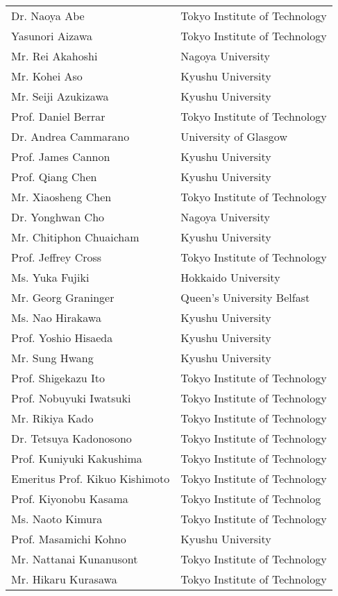 \begin{longtable}{ll}
Dr. Naoya Abe & Tokyo Institute of Technology \\
Yasunori Aizawa & Tokyo Institute of Technology \\
Mr. Rei Akahoshi & Nagoya University \\
Mr. Kohei Aso & Kyushu University \\
Mr. Seiji Azukizawa & Kyushu University \\
Prof. Daniel Berrar & Tokyo Institute of Technology \\
Dr. Andrea Cammarano & University of Glasgow \\
Prof. James Cannon & Kyushu University \\
Prof. Qiang Chen & Kyushu University \\
Mr. Xiaosheng Chen & Tokyo Institute of Technology \\
Dr. Yonghwan Cho & Nagoya University \\
Mr. Chitiphon Chuaicham & Kyushu University \\
Prof. Jeffrey Cross & Tokyo Institute of Technology \\
Ms. Yuka Fujiki & Hokkaido University \\
Mr. Georg Graninger & Queen's University Belfast \\
Ms. Nao Hirakawa & Kyushu University \\
Prof. Yoshio Hisaeda & Kyushu University \\
Mr. Sung Hwang & Kyushu University \\
Prof. Shigekazu Ito & Tokyo Institute of Technology \\
Prof. Nobuyuki Iwatsuki & Tokyo Institute of Technology \\
Mr. Rikiya Kado & Tokyo Institute of Technology \\
Dr. Tetsuya Kadonosono & Tokyo Institute of Technology \\
Prof. Kuniyuki Kakushima & Tokyo Institute of Technology \\
Emeritus Prof. Kikuo Kishimoto & Tokyo Institute of Technology \\
Prof. Kiyonobu Kasama & Tokyo Institute of Technolog \\
Ms. Naoto Kimura & Tokyo Institute of Technology \\
Prof. Masamichi Kohno & Kyushu University \\
Mr. Nattanai Kunanusont & Tokyo Institute of Technology \\
Mr. Hikaru Kurasawa & Tokyo Institute of Technology \\

\end{longtable}
